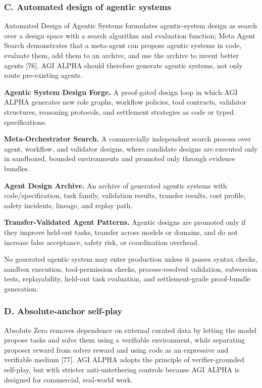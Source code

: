 \subsubsection{C. Automated design of agentic
systems}\label{c.-automated-design-of-agentic-systems}

Automated Design of Agentic Systems formulates agentic-system design as
search over a design space with a search algorithm and evaluation
function; Meta Agent Search demonstrates that a meta-agent can propose
agentic systems in code, evaluate them, add them to an archive, and use
the archive to invent better agents {[}76{]}. AGI ALPHA should therefore
generate agentic systems, not only route pre-existing agents.

\textbf{Agentic System Design Forge.} A proof-gated design loop in which
AGI ALPHA generates new role graphs, workflow policies, tool contracts,
validator structures, reasoning protocols, and settlement strategies as
code or typed specifications.

\textbf{Meta-Orchestrator Search.} A commercially independent search
process over agent, workflow, and validator designs, where candidate
designs are executed only in sandboxed, bounded environments and
promoted only through evidence bundles.

\textbf{Agent Design Archive.} An archive of generated agentic systems
with code/specification, task family, validation results, transfer
results, cost profile, safety incidents, lineage, and replay path.

\textbf{Transfer-Validated Agent Patterns.} Agentic designs are promoted
only if they improve held-out tasks, transfer across models or domains,
and do not increase false acceptance, safety risk, or coordination
overhead.

No generated agentic system may enter production unless it passes syntax
checks, sandbox execution, tool-permission checks, process-resolved
validation, subversion tests, replayability, held-out task evaluation,
and settlement-grade proof-bundle generation.

\subsubsection{D. Absolute-anchor
self-play}\label{d.-absolute-anchor-self-play}

Absolute Zero removes dependence on external curated data by letting the
model propose tasks and solve them using a verifiable environment, while
separating proposer reward from solver reward and using code as an
expressive and verifiable medium {[}77{]}. AGI ALPHA adopts the
principle of verifier-grounded self-play, but with stricter
anti-untethering controls because AGI ALPHA is designed for commercial,
real-world work.

